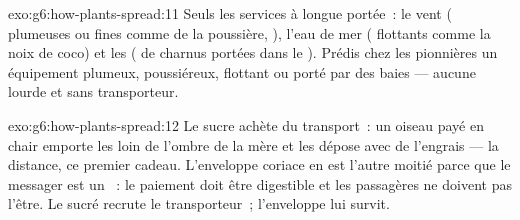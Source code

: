 \begin{solution}{exo:g6:how-plants-spread:11}
Seuls les services à longue portée~: le vent ( plumeuses ou
fines comme de la poussière, ), l'eau de mer ( flottants
comme la noix de coco) et les  ( de  charnus
portées dans le ). Prédis chez les pionnières un
équipement plumeux, poussiéreux, flottant ou porté par des baies ---
aucune  lourde et sans transporteur.
\end{solution}

\begin{solution}{exo:g6:how-plants-spread:12}
Le sucre achète du transport~: un oiseau payé en chair emporte les
 loin de l'ombre de la mère et les dépose avec de l'engrais
--- la distance, ce premier cadeau. L'enveloppe coriace en est
l'autre moitié parce que le messager est un ~: le
paiement doit être digestible et les passagères ne doivent pas
l'être. Le sucré recrute le transporteur~; l'enveloppe lui survit.
\end{solution}

